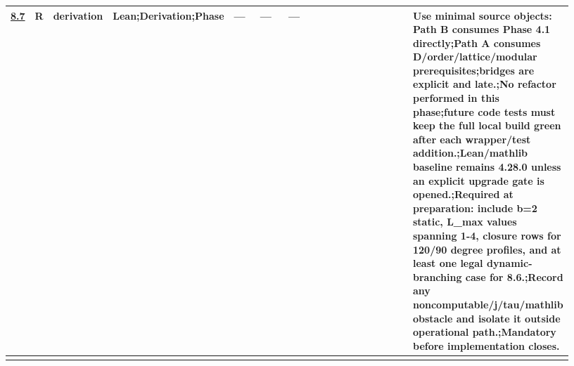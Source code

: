 \begin{longtable}{L{0.026\linewidth} L{0.024\linewidth} L{0.045\linewidth} L{0.07\linewidth} L{0.065\linewidth} L{0.075\linewidth} L{0.11\linewidth} L{0.19\linewidth} L{0.155\linewidth} L{0.17\linewidth}}
\hline
\addlinespace[0.24em]
\hyperlink{phase-row-8-7}{8.7} & R & derivation & Lean;\newline Derivation;\newline Phase & --- & --- & --- &  &  & Use minimal source objects: Path B consumes Phase 4.1 directly;\newline Path A consumes D/\allowbreak{}order/\allowbreak{}lattice/\allowbreak{}modular prerequisites;\newline bridges are explicit and late.;\newline No refactor performed in this phase;\newline future code tests must keep the full local build green after each wrapper/\allowbreak{}test addition.;\newline Lean/\allowbreak{}mathlib baseline remains 4.28.0 unless an explicit upgrade gate is opened.;\newline Required at preparation: include b=2 static, L\_max values spanning 1-4, closure rows for 120/\allowbreak{}90 degree profiles, and at least one legal dynamic-branching case for 8.6.;\newline Record any noncomputable/\allowbreak{}j/\allowbreak{}tau/\allowbreak{}mathlib obstacle and isolate it outside operational path.;\newline Mandatory before implementation closes.\\
\hline
\addlinespace[0.24em]

\end{longtable}
